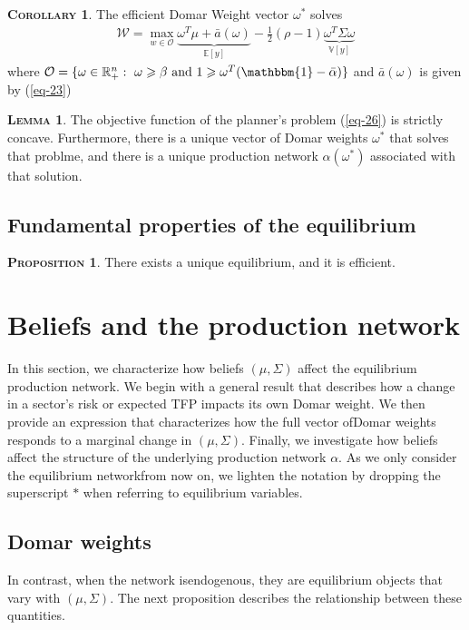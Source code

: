 \documentclass[11pt]{article}
\theoremstyle{definition}
\newtheorem{lemma}{\noindent \textbf{\textsc{Lemma}}}
\newtheorem{prop}{\noindent \textbf{\textsc{Proposition}}}
\newtheorem{cor}{\noindent \textbf{\textsc{Corollary}}}
\begin{document}
	
	\begin{cor}
		The efficient Domar Weight vector $\omega^*$ solves
		\begin{align}
			\mathcal{W} = \max\limits_{w\in\mathcal{O}} \underbrace{\omega^T\mu + \bar{a}(\omega)}\limits_{\mathbb{E}[y]} - \frac{1}{2}(\rho -1)\underbrace{\omega^T\Sigma\omega}\limits_{\mathbb{V}[y]} \label{eq-26}
		\end{align}
		where $\mathcal{O} = \{\omega\in\mathbb{R}_+^n:\ \omega\geqslant\beta\ \text{and}\ 1\geqslant \omega^T(\mathbbm{1}-\bar{\alpha}) \}$ and $\bar{a}(\omega)$ is given by (\ref{eq-23})
	\end{cor}
	
	\begin{lemma}
		The objective function of the planner's problem (\ref{eq-26}) is strictly concave. Furthermore, there is a unique vector of Domar weights $\omega^*$ that solves that problme, and there is a unique production network $\alpha(\omega^*)$ associated with that solution.
	\end{lemma}
	
	\subsection{Fundamental properties of the equilibrium}
	\begin{prop}
		There exists a unique equilibrium, and it is efficient.
	\end{prop}
	
	
	\newpage
	\section{Beliefs and the production network}
	In this section, we characterize how beliefs $(\mu,\Sigma)$ affect the equilibrium production network. We begin with a general result that describes how a change in a sector’s risk or expected TFP impacts its own Domar weight. We then provide an expression that characterizes how the full vector ofDomar weights responds to a marginal change in $(\mu,\Sigma)$. Finally, we investigate how beliefs affect the structure of the underlying production network $\alpha$. As we only consider the equilibrium networkfrom now on, we lighten the notation by dropping the superscript $*$ when referring to equilibrium variables.
	
	\subsection{Domar weights}
	In contrast, when the network isendogenous, they are equilibrium objects that vary with $(\mu,\Sigma)$. The next proposition describes the relationship between these quantities.
	
\end{document}
